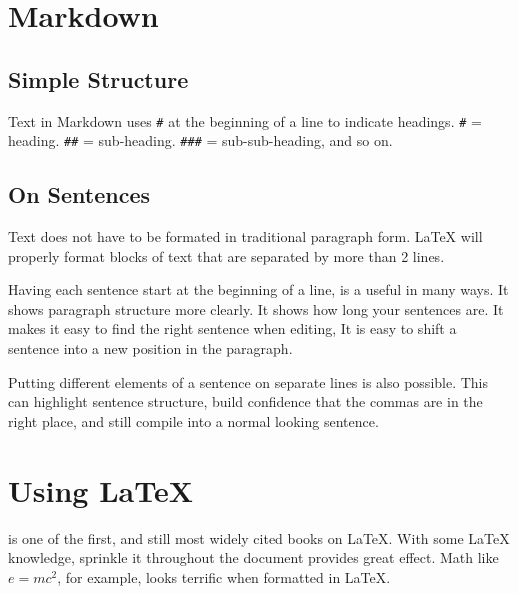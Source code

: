 \hypertarget{markdown}{%
\section{Markdown}\label{markdown}}

\hypertarget{simple-structure}{%
\subsection{Simple Structure}\label{simple-structure}}

Text in Markdown uses \texttt{\#} at the beginning of a line to indicate
headings. \texttt{\#} = heading. \texttt{\#\#} = sub-heading.
\texttt{\#\#\#} = sub-sub-heading, and so on.

\hypertarget{on-sentences}{%
\subsection{On Sentences}\label{on-sentences}}

Text does not have to be formated in traditional paragraph form. LaTeX
will properly format blocks of text that are separated by more than 2
lines.

Having each sentence start at the beginning of a line, is a useful in
many ways. It shows paragraph structure more clearly. It shows how long
your sentences are. It makes it easy to find the right sentence when
editing, It is easy to shift a sentence into a new position in the
paragraph.

Putting different elements of a sentence on separate lines is also
possible. This can highlight sentence structure, build confidence that
the commas are in the right place, and still compile into a normal
looking sentence.

\hypertarget{using}{%
\section{\texorpdfstring{Using \LaTeX}{Using }}\label{using}}

\textcite{lamport1994latex} is one of the first, and still most widely
cited books on LaTeX. With some LaTeX knowledge, sprinkle it throughout
the document provides great effect. Math like \(e=mc^2\), for example,
looks terrific when formatted in LaTeX.
